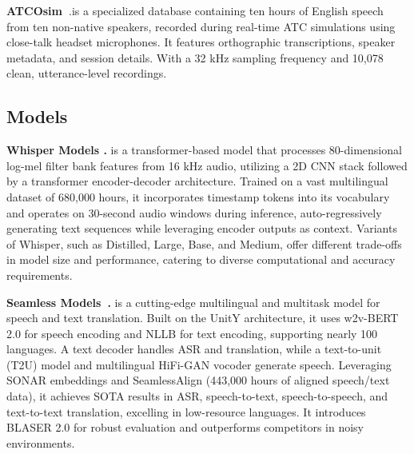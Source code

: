 \noindent\textbf{ATCOsim~}\cite{jan_van_doorn_2023}.is a specialized database containing ten hours of English speech from ten non-native speakers, recorded during real-time ATC simulations using close-talk headset microphones. It features orthographic transcriptions, speaker metadata, and session details. With a 32 kHz sampling frequency and 10,078 clean, utterance-level recordings. \\


\subsection{Models}
\noindent\textbf{Whisper Models \cite{radford2023robust}.}
is a transformer-based model that processes 80-dimensional log-mel filter bank features from 16 kHz audio, utilizing a 2D CNN stack followed by a transformer encoder-decoder architecture. Trained on a vast multilingual dataset of 680,000 hours, it incorporates timestamp tokens into its vocabulary and operates on 30-second audio windows during inference, auto-regressively generating text sequences while leveraging encoder outputs as context. Variants of Whisper, such as Distilled, Large, Base, and Medium, offer different trade-offs in model size and performance, catering to diverse computational and accuracy requirements.

\noindent\textbf{Seamless Models~\cite{communication2023seamlessm4tmassivelymultilingual, seamless2023, Barrault2025}.}
is a cutting-edge multilingual and multitask model for speech and text translation. Built on the UnitY architecture, it uses w2v-BERT 2.0 for speech encoding and NLLB for text encoding, supporting nearly 100 languages. A text decoder handles ASR and translation, while a text-to-unit (T2U) model and multilingual HiFi-GAN vocoder generate speech. Leveraging SONAR embeddings and SeamlessAlign (443,000 hours of aligned speech/text data), it achieves SOTA results in ASR, speech-to-text, speech-to-speech, and text-to-text translation, excelling in low-resource languages. It introduces BLASER 2.0 for robust evaluation and outperforms competitors in noisy environments. \\

